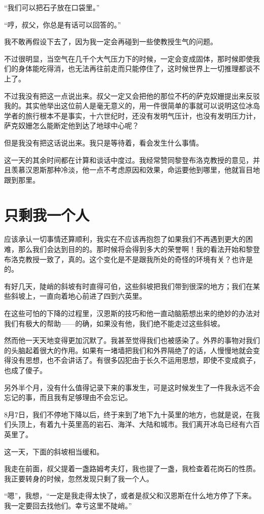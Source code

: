 \documentclass[10pt]{book}
\begin{document}
“我们可以把石子放在口袋里。”

“哼，叔父，你总是有话可以回答的。”

我不敢再假设下去了，因为我一定会再碰到一些使教授生气的问题。

不过很明显，当空气在几千个大气压力下的时候，一定会变成固体，那时候即使我们的身体能吃得消，也无法再往前走而只能停住了，这时候世界上一切推理都谈不上了。

不过我没有把这一点说出来。叔父一定又会把他的那位不朽的萨克奴姗提出来反驳我的。其实他举出这位前人是毫无意义的，用一件很简单的事就可以说明这位冰岛学者的旅行根本不是事实，十六世纪时，还没有发明气压计，也没有发明压力计，萨克奴姗怎么能断定他到达了地球中心呢？

但是我没有把这话说出来。我只是等待着，看会发生什么事情。

这一天的其余时间都在计算和谈话中度过。我经常赞同黎登布洛克教授的意见，并且羡慕汉恩斯那种冷淡，他一点不考虑原因和效果，命运要他到哪里，他就盲目地跟到那里。
\chapter{只剩我一个人}
应该承认一切事情还算顺利，我实在不应该再抱怨了如果我们不再遇到更大的困难，那么我们会达到目的的。那时候将会得到多大的荣誉啊！我的看法开始和黎登布洛克教授一致了，真的。这个变化是不是跟我所处的奇怪的环境有关？也许是的。

有好几天，陡峭的斜坡有时直得可伯，这些斜坡把我们带到很深的地方；我们在某些斜坡上，一直向着地心前进了四到六英里。

在这些可怕的下降的过程里，汉恩斯的技巧和他一直动脑筋想出来的绝妙的办法对我们有极大的帮助——的确，如果没有他，我们绝不能走过这些斜坡。

然而他一天天地变得更加沉默了。我甚至觉得我们也被感染了。外界的事物对我们的头脑起着很大的作用。如果有一堵墙把我们和外界隔绝了的话，人慢慢地就会变得没有思想，也不会讲话了。有很多囚犯由于长久不运用思想，即使不变成疯子，也成了傻子。

另外半个月，没有什么值得记录下来的事发生，可是这时候发生了一件我永远不会忘记的事，而且我有足够理由不会忘记。

8月7日，我们不停地下降以后，终于来到了地下九十英里的地方，也就是说，在我们头顶上，有着九十英里高的岩石、海洋、大陆和城市。我们离开冰岛已经有六百英里了。

这一天，下面的斜坡相当缓和。

我走在前面，叔父提着一盏路姆考夫灯，我也提了一盏，我检查着花岗石的性质。我正要转身的时候，忽然发现只剩了我一个人。

“嗯”，我想，“一定是我走得太快了，或者是叔父和汉恩斯在什么地方停了下来。我一定要回去找他们。幸亏这里不陡峭。”
\end{document}
